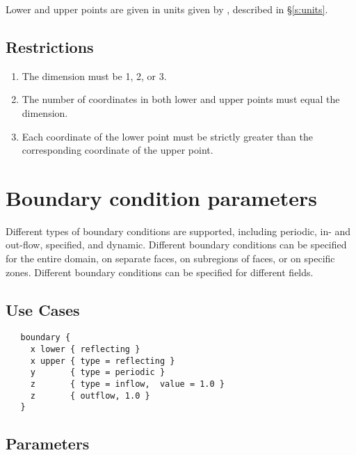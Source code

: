 \documentclass{book}
\begin{document}
Lower and upper points are given in units given by ,
described in \S\ref{s:units}.

\subsection{Restrictions}

\begin{enumerate}
\item The dimension must be 1, 2, or 3.
\item The number of coordinates in both lower and upper points must equal the dimension.
\item Each coordinate of the lower point must be strictly greater than the corresponding coordinate of the upper point.
\end{enumerate}

\section{Boundary condition parameters} \label{s:boundary}

Different types of boundary conditions are supported, including
periodic, in- and out-flow, specified, and dynamic.  Different
boundary conditions can be specified for the entire domain,
on separate faces, on subregions of faces, or on specific zones.
Different boundary conditions can be specified for different fields.
\subsection{Use Cases}

\begin{verbatim}
   boundary {
     x lower { reflecting }
     x upper { type = reflecting }
     y       { type = periodic }
     z       { type = inflow,  value = 1.0 }
     z       { outflow, 1.0 }
   }
\end{verbatim}
\subsection{Parameters}
\end{document}

